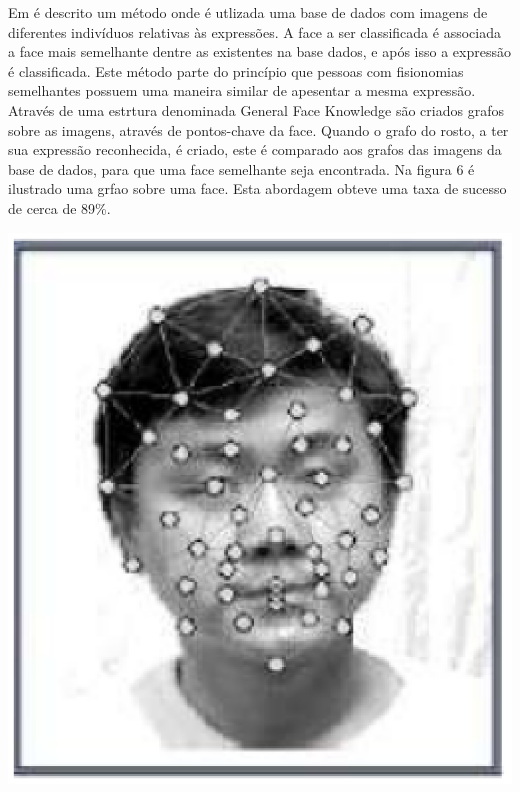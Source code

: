 Em \cite{Hong} é descrito um método onde é utlizada uma base de dados com imagens de diferentes indivíduos relativas às expressões. A face a ser classificada é associada a face mais semelhante dentre as existentes na base dados, e após isso a expressão é classificada. Este método parte do princípio que pessoas com fisionomias semelhantes possuem uma maneira similar de apesentar a mesma expressão. Através de uma estrtura denominada General Face Knowledge são criados grafos sobre as imagens, através de pontos-chave da face. Quando o grafo do rosto, a ter sua expressão reconhecida, é criado, este é comparado aos grafos das imagens da base de dados, para que uma face semelhante seja encontrada. Na figura 6 é ilustrado uma grfao sobre uma face. Esta abordagem obteve uma taxa de sucesso de cerca de 89\%.
\begin{center}
	\includegraphics[scale=0.5]{graficos/metodo1_classi}
\end{center}

